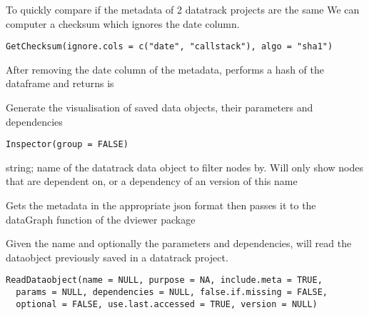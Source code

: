 \documentclass[a4paper]{book}
\begin{document}
%
\begin{Description}\relax
To quickly compare if the metadata of 2 datatrack projects are the same
We can computer a checksum which ignores the date column.
\end{Description}
%
\begin{Usage}
\begin{verbatim}
GetChecksum(ignore.cols = c("date", "callstack"), algo = "sha1")
\end{verbatim}
\end{Usage}
%
\begin{Details}\relax
After removing the date column of the metadata, performs a hash of the dataframe and returns is
\end{Details}
%
\begin{Description}\relax
Generate the visualisation of saved data objects, their parameters and dependencies
\end{Description}
%
\begin{Usage}
\begin{verbatim}
Inspector(group = FALSE)
\end{verbatim}
\end{Usage}
%
\begin{Arguments}
\begin{ldescription}
\item[\code{group}] string; name of the datatrack data object to filter nodes by.
Will only show nodes that are dependent on, or a dependency of an version of this name
\end{ldescription}
\end{Arguments}
%
\begin{Details}\relax
Gets the metadata in the appropriate json format then passes it to the dataGraph function of the dviewer package
\end{Details}
%
\begin{Description}\relax
Given the name and optionally the parameters and dependencies, will read the dataobject previously saved in a datatrack project.
\end{Description}
%
\begin{Usage}
\begin{verbatim}
ReadDataobject(name = NULL, purpose = NA, include.meta = TRUE,
  params = NULL, dependencies = NULL, false.if.missing = FALSE,
  optional = FALSE, use.last.accessed = TRUE, version = NULL)
\end{verbatim}
\end{Usage}
\end{document}
